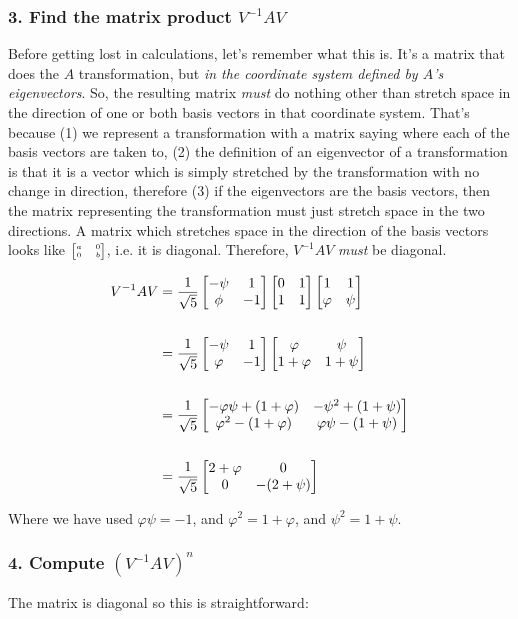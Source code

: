 \subsubsection{3. Find the matrix product $V^{-1}AV$}

Before getting lost in calculations, let's remember what this is. It's a
matrix that does the $A$ transformation, but \textit{in the coordinate system defined
by $A$'s eigenvectors}. So, the resulting matrix \textit{must} do nothing other than
stretch space in the direction of one or both basis vectors in that coordinate
system. That's because (1) we represent a transformation with a matrix saying
where each of the basis vectors are taken to, (2) the definition of an
eigenvector of a transformation is that it is a vector which is simply
stretched by the transformation with no change in direction, therefore (3) if
the eigenvectors are the basis vectors, then the matrix representing the
transformation must just stretch space in the two directions. A matrix which
stretches space in the direction of the basis vectors looks like
$\tiny{\begin{bmatrix}a & 0\\0 & b\\ \end{bmatrix}}$, i.e. it is diagonal. Therefore, $V^{-1}AV$ \textit{must} be
diagonal.

\begin{align*}
V^{-1}AV &=
\frac{1}{\sqrt5}
\begin{bmatrix}-\psi & 1\\\phi  & -1\\ \end{bmatrix}
\begin{bmatrix}0 & 1\\1 & 1\\ \end{bmatrix}
\begin{bmatrix}1 & 1\\\varphi & \psi\\ \end{bmatrix}
\\\\
&=
\frac{1}{\sqrt5}
\begin{bmatrix}-\psi & 1 \\\varphi  & -1\\ \end{bmatrix}
\begin{bmatrix}\varphi     & \psi    \\1 + \varphi & 1 + \psi\\ \end{bmatrix}
\\\\
&=
\frac{1}{\sqrt5}
\begin{bmatrix}-\varphi\psi + (1 + \varphi) & -\psi^2 + (1 + \psi)\\\varphi^2 - (1 + \varphi) & \varphi\psi - (1 + \psi)\\ \end{bmatrix}
\\\\
&=
\frac{1}{\sqrt5}
\begin{bmatrix}2 + \varphi & 0\\0 & -(2+\psi)\\ \end{bmatrix}
\end{align*}

Where we have used $\varphi\psi = -1$, and $\varphi^2 = 1 + \varphi$, and $\psi^2 = 1 + \psi$.




\subsubsection{4. Compute $(V^{-1}AV)^n$}

The matrix is diagonal so this is straightforward:

